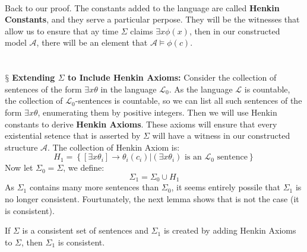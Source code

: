 \documentclass[9pt,a4paper, twocolumn]{article}
\newcommand{\newpoint}[1]{\ \\ \indent$\mathsection$ \textbf{#1}}
\newcommand{\curveL}{\mathcal{L}}
\newcommand{\curveA}{\mathcal{A}}
\begin{document}
        \\
        \indent Back to our proof. The constants added to the language are called \textbf{Henkin Constants}, and they serve a particular perpose. They will be the witnesses that allow us to ensure that ay time $\Sigma$ claims $\exists x\phi(x)$, then in our constructed model $\curveA$, there will be an element that $\curveA\vDash \phi(c)$.
        \\
        \\
        \newpoint{Extending $\Sigma$ to Include Henkin Axioms:} Consider the collection of sentences of the form $\exists x \theta$ in the language $\curveL_0$. As the language $\curveL$ is countable, the collection of $\curveL_0$-sentences is countable, so we can list all such sentences of the form $\exists x\theta$, enumerating them by positive integers. Then we will use Henkin constants to derive 
        \textbf{Henkin Axioms}. These axioms will ensure that every existential setence that is asserted by $\Sigma$ will have a witness in our constructed structure $\curveA$. The collection of Henkin Axiom is:
        \begin{equation}
            H_1 = \left\{
                \left[
                    \exists x \theta_i 
                \right]\rightarrow \theta_i(c_i) | \left(
                    \exists x\theta_i
                \right) 
            \text{ is an }\curveL_0 \text{ sentence}
            \right\}
        \end{equation}
        Now let $\Sigma_0 = \Sigma$, we define:
        \begin{equation}
            \Sigma_1 = \Sigma_0 \cup H_1
        \end{equation}
        As $\Sigma_1$ contains many more sentences than $\Sigma_0$, it seems entirely possile that $\Sigma_1$ is no longer consistent. Fourtunately, the next lemma shows that is not the case (it is consistent).
        \begin{lemma}
            If $\Sigma$ is a consistent set of sentences and $\Sigma_1$ is created by adding Henkin Axioms to $\Sigma$, then $\Sigma_1$ is consistent.
        \end{lemma}
\end{document}
